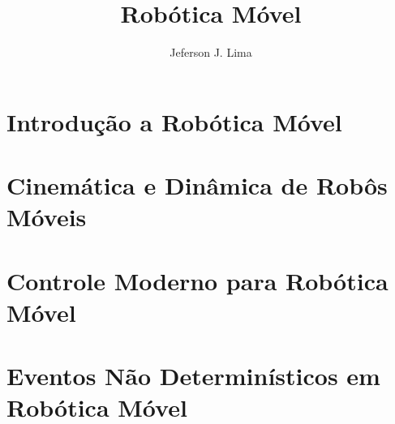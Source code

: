 \documentclass[krantz1,ChapterTOCs]{krantz}
\begin{document}
\frontmatter

\title{Robótica Móvel 
}
\author{Jeferson J. Lima}

\maketitle

%
\setcounter{page}{7} %
\tableofcontents
%
%
\listoffigures
\listoftables
%
%

\mainmatter


\part{Introdução a Robótica Móvel}


\part{Cinemática e Dinâmica de Robôs Móveis}


\part{Controle Moderno para Robótica Móvel}


\part{Eventos Não Determinísticos em Robótica Móvel}






 

\end{document}
